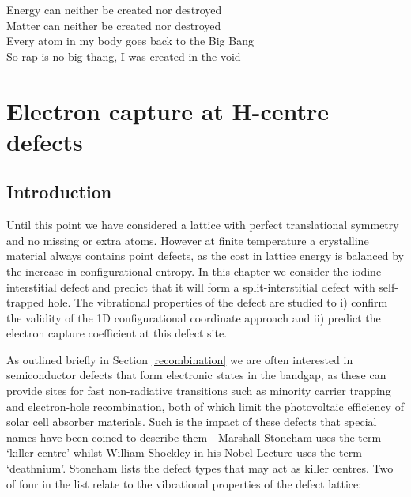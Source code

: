 \begin{savequote}[8cm]
Energy can neither be created nor destroyed \\
Matter can neither be created nor destroyed \\
Every atom in my body goes back to the Big Bang \\
So rap is no big thang, I was created in the void
\end{savequote}

\chapter{\label{ch:6-defects}Electron capture at H-centre defects}





\section{Introduction}

Until this point we have considered a lattice with perfect translational symmetry and no missing or extra atoms. However at finite temperature a crystalline material always contains point defects, as the cost in lattice energy is balanced by the increase in configurational entropy.
In this chapter we consider the iodine interstitial defect and predict that it will form a split-interstitial defect with self-trapped hole. The vibrational properties of the defect are studied to i) confirm the validity of the 1D configurational coordinate approach and ii) predict the electron capture coefficient at this defect site.

As outlined briefly in Section \ref{recombination} we are often interested in semiconductor defects that form electronic states in the bandgap, as these can provide sites for fast non-radiative transitions such as minority carrier trapping and electron-hole recombination, both of which limit the photovoltaic efficiency of solar cell absorber materials. Such is the impact of these defects that special names have been coined to describe them - Marshall Stoneham uses the term `killer centre'\autocite{Hayes1985} whilst William Shockley in his Nobel Lecture uses the term `deathnium'.\autocite{shockley}
Stoneham lists the defect types that may act as killer centres. Two of four in the list relate to the vibrational properties of the defect lattice:


